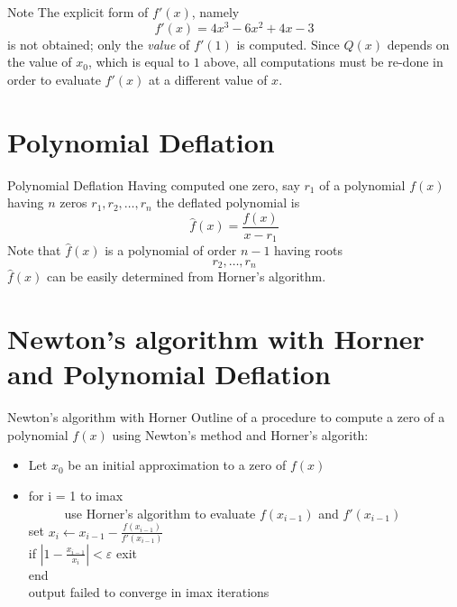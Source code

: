 \documentclass[12pt]{beamer}
\begin{document}
\begin{frame}{Note}
The explicit form of $f'(x)$, namely 
\[
  f'(x) = 4x^3 - 6 x^ 2 + 4 x - 3 
\]
\noindent 
is not obtained; only the {\it value} of $f'(1)$ is computed. Since $Q(x)$ depends on the value of $x_0$, which is equal to $1$ above, all computations must be re-done in order to evaluate $f'(x)$ at a different value of $x$.  
\end{frame} 

\section{Polynomial Deflation}
\begin{frame}{Polynomial Deflation} 
Having computed one zero, say $r_1$ of a polynomial $f(x)$ having $n$ zeros 
$r_1, r_2, \dots, r_n$ the deflated polynomial is 
\[
\hat f(x) = \frac{f(x)}{x-r_1} 
\]
\noindent 
Note that $\hat f(x)$ is a polynomial of order $n-1$ having roots 
\[ 
r_2, \dots, r_n 
\] 
\noindent 
$\hat f(x)$ can be easily determined from Horner's algorithm. 
\end{frame} 


\section{Newton's algorithm with Horner and Polynomial Deflation} 

\begin{frame}{Newton's algorithm with Horner} 
Outline of a procedure to compute a zero of a polynomial $f(x)$ using 
Newton's method and Horner's algorith: 

\begin{itemize} 
\item Let $x_0$ be an initial approximation to a zero of $f(x)$ 
\item 
for i = 1 to imax \\ 
$\;\;\;\;\;\;\;\;\;$ use Horner's algorithm to evaluate $f(x_{i-1})$ and $f'(x_{i-1})$ \\ 
\hspace{2cm} set $x_i \leftarrow x_{i-1} - \frac{f(x_{i-1})}{f'(x_{i-1})}$ \\ 
\hspace{2cm} if $| 1 - \frac{x_{i-1}}{x_i}| < \varepsilon$ exit \\
end \\ 
output failed to converge in imax iterations
\end{itemize} 
\end{frame} 
\end{document}
